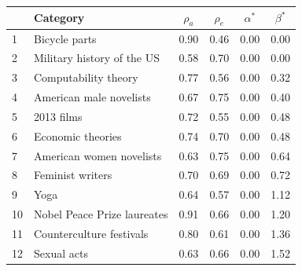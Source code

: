 

\begin{table}
\begin{tabular}{|llcccc|}
\hline
         &                     Category & $\rho_a$ & $\rho_e$ & $\alpha^{*}$ & $\beta^{*}$ \\
\hline
 1&                        Bicycle parts  &     0.90 &     0.46 &     0.00 &    0.00 \\
 2&Military history of the US  &     0.58 &     0.70 &     0.00 &    0.00 \\
  3&                Computability theory &     0.77 &     0.56 &     0.00 &    0.32 \\
   4&            American male novelists &     0.67 &     0.75 &     0.00 &    0.40 \\
    5&                        2013 films  &     0.72 &     0.55 &     0.00 &    0.48 \\
     6&                Economic theories  &     0.74 &     0.70 &     0.00 &    0.48 \\
     7&         American women novelists  &     0.63 &     0.75 &     0.00 &    0.64 \\
     8&                 Feminist writers  &     0.70 &     0.69 &     0.00 &    0.72 \\
     9&                             Yoga  &     0.64 &     0.57 &     0.00 &    1.12 \\
     10&      Nobel Peace Prize laureates  &     0.91 &     0.66 &     0.00 &    1.20 \\
      11&        Counterculture festivals  &     0.80 &     0.61 &     0.00 &    1.36 \\
        12&                   Sexual acts  &     0.63 &     0.66 &     0.00 &    1.52 \\

\end{tabular}
\end{table}
